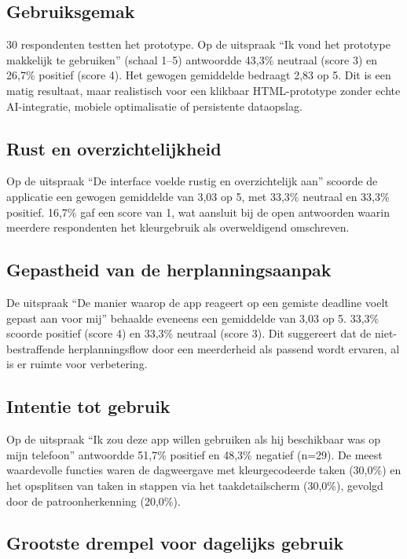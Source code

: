 \subsection{Gebruiksgemak}

30 respondenten testten het prototype. Op de uitspraak ``Ik vond het prototype
makkelijk te gebruiken'' (schaal 1--5) antwoordde 43,3\% neutraal (score 3) en
26,7\% positief (score 4). Het gewogen gemiddelde bedraagt 2,83 op 5. Dit is
een matig resultaat, maar realistisch voor een klikbaar HTML-prototype zonder
echte AI-integratie, mobiele optimalisatie of persistente dataopslag.

\subsection{Rust en overzichtelijkheid}

Op de uitspraak ``De interface voelde rustig en overzichtelijk aan'' scoorde de
applicatie een gewogen gemiddelde van 3,03 op 5, met 33,3\% neutraal en 33,3\%
positief. 16,7\% gaf een score van 1, wat aansluit bij de open antwoorden
waarin meerdere respondenten het kleurgebruik als overweldigend omschreven.

\subsection{Gepastheid van de herplanningsaanpak}

De uitspraak ``De manier waarop de app reageert op een gemiste deadline voelt
gepast aan voor mij'' behaalde eveneens een gemiddelde van 3,03 op 5. 33,3\%
scoorde positief (score 4) en 33,3\% neutraal (score 3). Dit suggereert dat de
niet-bestraffende herplanningsflow door een meerderheid als passend wordt
ervaren, al is er ruimte voor verbetering.

\subsection{Intentie tot gebruik}

Op de uitspraak ``Ik zou deze app willen gebruiken als hij beschikbaar was op
mijn telefoon'' antwoordde 51,7\% positief en 48,3\% negatief (n=29). De
meest waardevolle functies waren de dagweergave met kleurgecodeerde taken (30,0\%)
en het opsplitsen van taken in stappen via het taakdetailscherm (30,0\%),
gevolgd door de patroonherkenning (20,0\%).

\subsection{Grootste drempel voor dagelijks gebruik}


